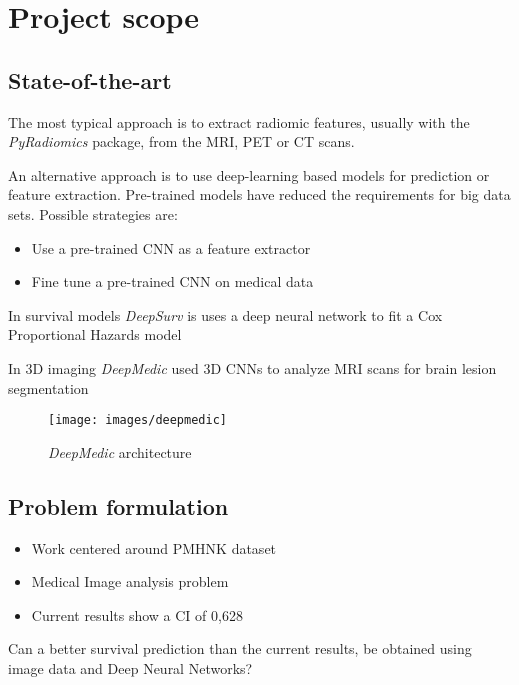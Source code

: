 
\section{Project scope}
\subsection{State-of-the-art}
\begin{frame}{\insertsubsec}
  The most typical approach is to extract radiomic features, usually with
  the \emph{PyRadiomics} package, from the MRI, PET or CT scans.

  \vspace{.5cm}
  An alternative approach is to use deep-learning based models for prediction or 
  feature extraction. Pre-trained models have reduced the requirements for big data sets.
  Possible strategies are:
  \begin{itemize}
    \item Use a pre-trained CNN as a feature extractor
    \item Fine tune a pre-trained CNN on medical data
  \end{itemize}
  \vspace{.5cm}
  In survival models \emph{DeepSurv} is uses a deep neural network to fit a Cox Proportional 
  Hazards model
\end{frame}

\begin{frame}
  In 3D imaging \emph{DeepMedic} used 3D CNNs to analyze MRI scans for brain lesion segmentation

  \vspace{.5cm}
  \begin{figure}
    \centering
    \texttt{[image: images/deepmedic]}
    \caption{\emph{DeepMedic} architecture}
  \end{figure}
\end{frame}

\subsection{Problem formulation}
\begin{frame}{\insertsubsec}

  \begin{itemize}
    \item Work centered around PMHNK dataset
    \item Medical Image analysis problem
    \item Current results show a CI of 0,628
  \end{itemize}
  
  Can a better survival prediction than the current results, be obtained using image
  data and Deep Neural Networks?
\end{frame}

